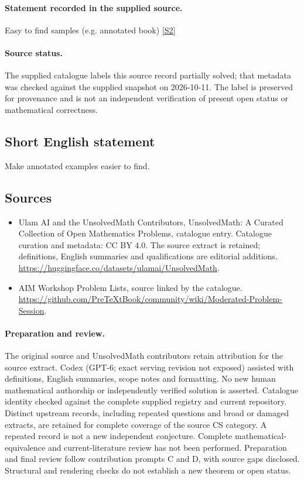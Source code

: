 \documentclass[11pt]{article}
\begin{document}
\paragraph{Statement recorded in the supplied source.}
Easy to find samples (e.g. annotated book) \href{https://github.com/PreTeXtBook/community/wiki/Moderated-Problem-Session}{[S2]}
\paragraph{Source status.}
The supplied catalogue labels this source record partially solved; that metadata was checked against the supplied snapshot on 2026-10-11. The label is preserved for provenance and is not an independent verification of present open status or mathematical correctness.
\subsection{Short English statement}
Make annotated examples easier to find.
\subsection{Sources}
\begin{itemize}
\item[S1] Ulam AI and the UnsolvedMath Contributors, UnsolvedMath: A Curated Collection of Open Mathematics Problems, catalogue entry. Catalogue curation and metadata: CC BY 4.0. The source extract is retained; definitions, English summaries and qualifications are editorial additions.
\url{https://huggingface.co/datasets/ulamai/UnsolvedMath}.
\item[S2] AIM Workshop Problem Lists, source linked by the catalogue.
\url{https://github.com/PreTeXtBook/community/wiki/Moderated-Problem-Session}.
\end{itemize}
\paragraph{Preparation and review.}
The original source and UnsolvedMath contributors retain attribution for the source extract. Codex (GPT-6; exact serving revision not exposed) assisted with definitions, English summaries, scope notes and formatting. No new human mathematical authorship or independently verified solution is asserted. Catalogue identity checked against the complete supplied registry and current repository. Distinct upstream records, including repeated questions and broad or damaged extracts, are retained for complete coverage of the source CS category. A repeated record is not a new independent conjecture. Complete mathematical-equivalence and current-literature review has not been performed. Preparation and final review follow contribution prompts C and D, with source gaps disclosed. Structural and rendering checks do not establish a new theorem or open status.
\label{end:statement}
\end{document}
